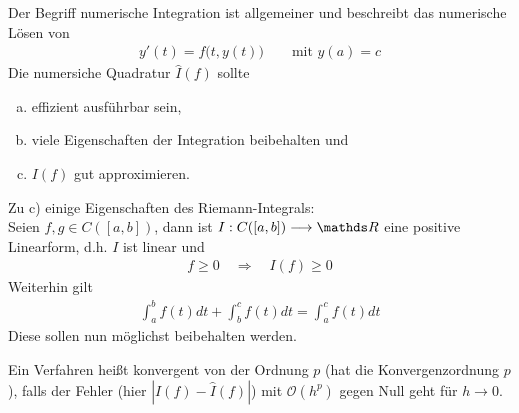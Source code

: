 \documentclass[ngerman,fontsize=11pt, paper=a4, parskip=half, titlepage=true, toc=bib]{scrbook}
\begin{document}
Der Begriff numerische Integration ist allgemeiner und
beschreibt das numerische Lösen von
\begin{gather*}
  y'(t) = f\big(t,y(t)\big) \qquad \text{mit } y(a)=c
\end{gather*}
Die numersiche Quadratur $\hat{I}(f)$ sollte
\begin{enumerate}[a)]
\item effizient ausführbar sein,
\item viele Eigenschaften der Integration beibehalten und
\item $I(f)$ gut approximieren.
\end{enumerate}
Zu c) einige Eigenschaften des Riemann-Integrals:\\
Seien $f,g\in C([a,b])$, dann ist $I:C([a,b])\longrightarrow\R$
eine positive Linearform, d.h. $I$ ist linear und 
\begin{gather}
  f\geq 0 \quad \Rightarrow \quad I(f)\geq 0
  \label{VII.1.1}
\end{gather}
Weiterhin gilt
\begin{gather}
  \int_a^b f(t)dt + \int_b^c f(t)dt = \int_a^cf(t)dt
  \label{VII.1.2}
\end{gather}
Diese sollen nun möglichst beibehalten werden.

\begin{Defe}\label{7.1.1}
  Ein Verfahren heißt konvergent von der Ordnung $p$
  (hat die Konvergenzordnung $p$),
  falls der Fehler (hier $|I(f)-\hat{I}(f)|$)
  mit $\mathcal{O}(h^p)$ gegen Null geht für $h\longrightarrow 0$.
\end{Defe}
\end{document}
